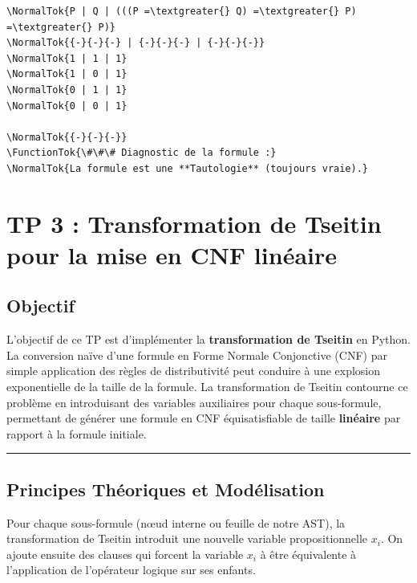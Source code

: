 \documentclass[11pt,a4paper]{article}
\begin{document}
\begin{lstlisting}
\NormalTok{P | Q | (((P =\textgreater{} Q) =\textgreater{} P) =\textgreater{} P)}
\NormalTok{{-}{-}{-} | {-}{-}{-} | {-}{-}{-}}
\NormalTok{1 | 1 | 1}
\NormalTok{1 | 0 | 1}
\NormalTok{0 | 1 | 1}
\NormalTok{0 | 0 | 1}

\NormalTok{{-}{-}{-}}
\FunctionTok{\#\#\# Diagnostic de la formule :}
\NormalTok{La formule est une **Tautologie** (toujours vraie).}
\end{lstlisting}
\n
\hypertarget{tp-3-transformation-de-tseitin-pour-la-mise-en-cnf-linuxe9aire}{%
\section{TP 3 : Transformation de Tseitin pour la mise en CNF
linéaire}\label{tp-3-transformation-de-tseitin-pour-la-mise-en-cnf-linuxe9aire}}

\hypertarget{objectif}{%
\subsection{Objectif}\label{objectif}}

L'objectif de ce TP est d'implémenter la \textbf{transformation de
Tseitin} en Python. La conversion naïve d'une formule en Forme Normale
Conjonctive (CNF) par simple application des règles de distributivité
peut conduire à une explosion exponentielle de la taille de la formule.
La transformation de Tseitin contourne ce problème en introduisant des
variables auxiliaires pour chaque sous-formule, permettant de générer
une formule en CNF équisatisfiable de taille \textbf{linéaire} par
rapport à la formule initiale.

\begin{center}\rule{0.5\linewidth}{0.5pt}\end{center}

\hypertarget{principes-thuxe9oriques-et-moduxe9lisation}{%
\subsection{Principes Théoriques et
Modélisation}\label{principes-thuxe9oriques-et-moduxe9lisation}}

Pour chaque sous-formule (nœud interne ou feuille de notre AST), la
transformation de Tseitin introduit une nouvelle variable
propositionnelle \(x_i\). On ajoute ensuite des clauses qui forcent la
variable \(x_i\) à être équivalente à l'application de l'opérateur
logique sur ses enfants.
\end{document}
